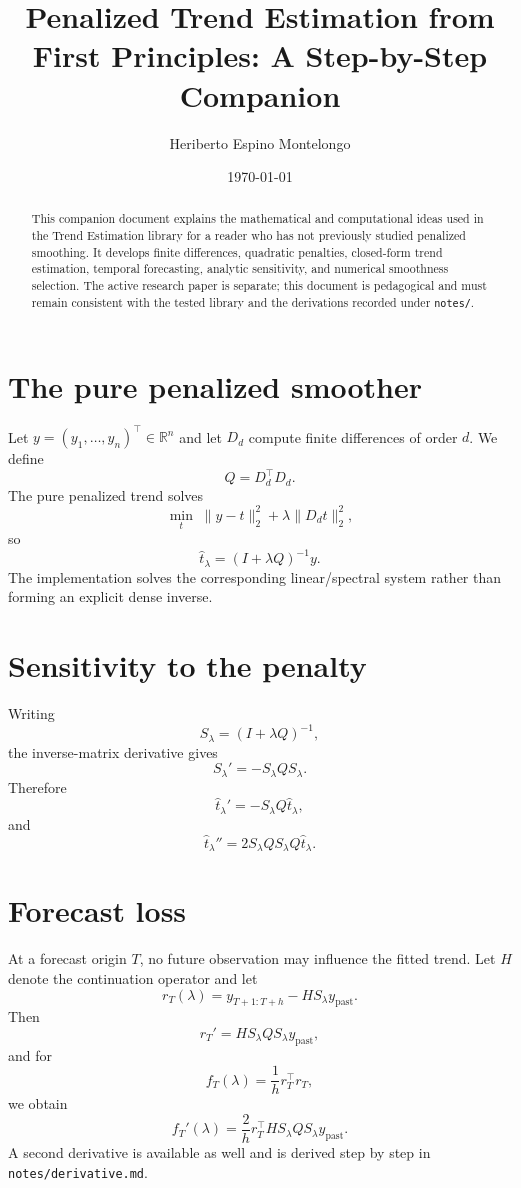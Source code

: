 \documentclass[11pt]{article}
\title{Penalized Trend Estimation from First Principles: A Step-by-Step Companion}
\author{Heriberto Espino Montelongo}
\date{\today}
\newcommand{\R}{\mathbb{R}}
\begin{document}
\maketitle

\begin{abstract}
This companion document explains the mathematical and computational ideas used
in the Trend Estimation library for a reader who has not previously studied
penalized smoothing. It develops finite differences, quadratic penalties,
closed-form trend estimation, temporal forecasting, analytic sensitivity, and
numerical smoothness selection. The active research paper is separate; this
document is pedagogical and must remain consistent with the tested library and
the derivations recorded under \texttt{notes/}.
\end{abstract}

\section{The pure penalized smoother}
Let $y=(y_1,\ldots,y_n)^\top\in\R^n$ and let $D_d$ compute finite
differences of order $d$. We define
\[
Q=D_d^\top D_d.
\]
The pure penalized trend solves
\[
\min_t\;\|y-t\|_2^2+\lambda\|D_dt\|_2^2,
\]
so
\[
\boxed{
\widehat t_\lambda=(I+\lambda Q)^{-1}y.
}
\]
The implementation solves the corresponding linear/spectral system rather than
forming an explicit dense inverse.

\section{Sensitivity to the penalty}
Writing
\[
S_\lambda=(I+\lambda Q)^{-1},
\]
the inverse-matrix derivative gives
\[
S_\lambda'=-S_\lambda Q S_\lambda.
\]
Therefore
\[
\boxed{
\widehat t_\lambda'=-S_\lambda Q\widehat t_\lambda,
}
\]
and
\[
\boxed{
\widehat t_\lambda''
=
2S_\lambda Q S_\lambda Q\widehat t_\lambda.
}
\]

\section{Forecast loss}
At a forecast origin $T$, no future observation may influence the fitted trend.
Let $H$ denote the continuation operator and let
\[
r_T(\lambda)
=
y_{T+1:T+h}
-
H S_\lambda y_{\mathrm{past}}.
\]
Then
\[
r_T'
=
H S_\lambda Q S_\lambda y_{\mathrm{past}},
\]
and for
\[
f_T(\lambda)=\frac1h r_T^\top r_T,
\]
we obtain
\[
\boxed{
f_T'(\lambda)
=
\frac{2}{h}
r_T^\top
H S_\lambda Q S_\lambda y_{\mathrm{past}}.
}
\]
A second derivative is available as well and is derived step by step in
\texttt{notes/derivative.md}.
\end{document}
